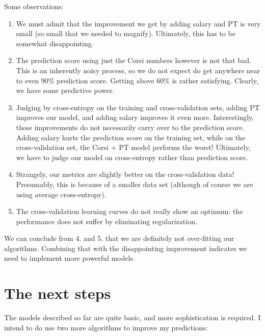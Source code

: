 \documentclass[11pt]{article}
\begin{document}
    Some observations:

\begin{enumerate}
\def\labelenumi{\arabic{enumi}.}
\itemsep1pt\parskip0pt
\item
  We must admit that the improvement we get by adding salary and PT is
  very small (so small that we needed to magnify). Ultimately, this has
  to be somewhat disappointing.
\item
  The prediction score using just the Corsi numbers however is not that
  bad. This is an inherently noisy process, so we do not expect do get
  anywhere near to even 90\% prediction score. Getting above 60\% is
  rather satisfying. Clearly, we have some predictive power.
\item
  Judging by cross-entropy on the training and cross-validation sets,
  adding PT improves our model, and adding salary improves it even more.
  Interestingly, these improvements do not necessarily carry over to the
  prediction score. Adding salary hurts the prediction score on the
  training set, while on the cross-validation set, the Corsi + PT model
  performs the worst! Ultimately, we have to judge our model on
  cross-entropy rather than prediction score.
\item
  Strangely, our metrics are slightly better on the cross-validation
  data! Presumably, this is because of a smaller data set (although of
  course we are using average cross-entropy).
\item
  The cross-validation learning curves do not really show an optimum:
  the performance does not suffer by eliminating regularization.
\end{enumerate}

We can conclude from 4. and 5. that we are definitely not over-fitting
our algorithms. Combining that with the disappointing improvement
indicates we need to implement more powerful models.

    \section{The next steps}\label{the-next-steps}

    The models described so far are quite basic, and more sophistication is
required. I intend to do use two more algorithms to improve my
predictions:
\end{document}
